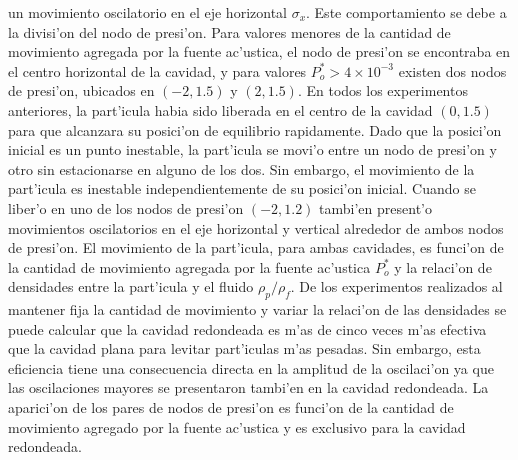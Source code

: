 un movimiento oscilatorio en el eje horizontal $\sigma_x$. Este comportamiento se debe a la divisi'on del nodo de 
presi'on. Para valores menores de la cantidad de movimiento agregada por la fuente ac'ustica, el nodo de presi'on
se encontraba en el centro horizontal de la cavidad, y para valores $P_o^\ast >4\times 10^{-3}$ existen dos
nodos de presi'on, ubicados en $(-2,1.5)$ y $(2,1.5)$. En todos los experimentos anteriores, la part'icula
habia sido liberada en el centro de la cavidad $(0,1.5)$ para que alcanzara su posici'on de equilibrio
rapidamente.  Dado que la posici'on inicial es un punto inestable, la part'icula se movi'o entre un nodo de
presi'on y otro sin estacionarse en alguno de los dos. Sin embargo, el movimiento de la part'icula es inestable
independientemente de su posici'on inicial. Cuando se liber'o en uno de los nodos de presi'on $(-2,1.2)$ tambi'en
present'o movimientos oscilatorios en el eje horizontal y vertical alrededor de ambos nodos de presi'on.
El movimiento de la part'icula, para ambas cavidades, es funci'on de la cantidad de movimiento agregada 
por la fuente ac'ustica $P_o^\ast$ y la relaci'on de densidades entre la part'icula y el fluido $\rho_p/\rho_f$.
De los experimentos realizados al mantener fija la cantidad de movimiento y variar la relaci'on de las densidades
se puede calcular que la cavidad redondeada es m'as de cinco veces m'as efectiva que la cavidad plana para levitar
part'iculas m'as pesadas. Sin embargo, esta eficiencia tiene una consecuencia directa en la amplitud de la oscilaci'on
ya que las oscilaciones mayores se presentaron tambi'en en la cavidad redondeada. La aparici'on de los pares de 
nodos de presi'on es funci'on de la cantidad de movimiento agregado por la fuente ac'ustica y es exclusivo para 
la cavidad redondeada.

 
